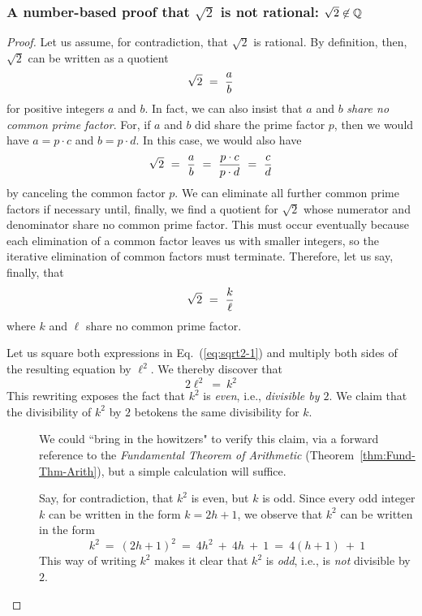 \subsubsection{A number-based proof that $\sqrt{2}$ is not rational: $\sqrt{2} \not\in \mathbb{Q}$}
\label{sec:classical-proof-sqrt(2)}

\begin{proof}
Let us assume, for contradiction, that $\sqrt{2}$ is rational.  By definition, then, $\sqrt{2}$ can be written as a quotient
\[ \sqrt{2} \ = \ {a \over b} \]
for positive integers $a$ and $b$.  In fact, we can also insist that $a$ and $b$ {\em share no common prime factor}.  For, if $a$ and $b$ did share the prime factor $p$, then we would have $a = p \cdot c$ and $b = p \cdot d$.  In this case, we would also have
\[ \sqrt{2} \ = \ {a \over b} \ = \ \frac{p \cdot c}{p \cdot d} \ = \ {c \over d} \]
by canceling the common factor $p$.  We can eliminate all further common prime factors if necessary until, finally, we find a quotient for $\sqrt{2}$ whose numerator and denominator share no common prime factor.  This must occur eventually because each elimination of a common factor leaves us with smaller integers, so the iterative elimination of common factors must terminate.  Therefore, let us say, finally, that
\begin{equation}
\label{eq:sqrt2-1}
\sqrt{2} \ = \ {k \over \ell}
\end{equation}
where $k$ and $\ell$ share no common prime factor.

\smallskip

Let us square both expressions in Eq.~(\ref{eq:sqrt2-1}) and multiply both sides of the resulting equation by $\ell^2$.  We thereby discover that
\begin{equation}
\label{eq:sqrt2-2}
2 \ell^2 \ = \ k^2
\end{equation}
This rewriting exposes the fact that $k^2$ is {\em even}, i.e., {\em divisible by $2$}.  We claim that the divisibility of $k^2$ by $2$ betokens the same divisibility for $k$.
\begin{description}
\item[]
We could ``bring in the howitzers" to verify this claim, via a forward reference to the {\em Fundamental Theorem of Arithmetic} (Theorem~\ref{thm:Fund-Thm-Arith}), but a simple calculation will suffice.

\smallskip

Say, for contradiction, that $k^2$ is even, but $k$ is odd.  Since every odd integer $k$ can be written in the form $k = 2h+1$, we observe that $k^2$ can be written in the form
\[ k^2 \ = \ (2h+1)^2 \ = \ 4h^2 \ + \ 4h \ + \ 1 \ = \ 4(h+1) \ + \ 1 \]
This way of writing $k^2$ makes it clear that $k^2$ is {\em odd}, i.e., is {\em not} divisible by $2$.


\end{description}
\end{proof}
